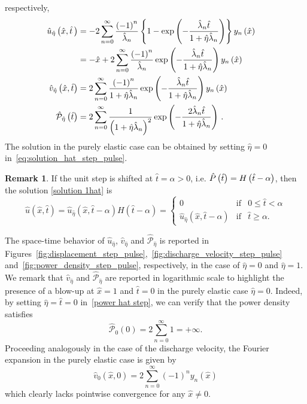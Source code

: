 \documentclass[12pt,a4paper]{amsart}
\theoremstyle{definition}
\newtheorem{remark}{Remark}
\newcommand{\hu}{\hat{u}}
\newcommand{\hx}{\hat{x}}
\newcommand{\hatt}{\hat{t}}
\newcommand{\heta}{\hat{\eta}}
\newcommand{\hv}{\hat{v}}
\newcommand{\hlambda}{\hat{\lambda}}
\begin{document}
respectively,
\begin{subequations}
\label{eq:solution_hat_step_pulse}
\begin{align}
\hu_{\heta}\left( \hx,\hatt\,\right) & =-2\sum_{n=0}^{\infty }\frac{\left(
-1\right) ^{n}}{\hlambda_{n}}\left\{ 1-\exp \left( -\frac{\hlambda_{n}\hatt}{%
1+\heta\hlambda_{n}}\right) \right\} y_{n}\left( \hx\right)  & &  \notag \\
& =-\hx+2\sum_{n=0}^{\infty }\frac{\left( -1\right) ^{n}}{\hlambda_{n}}\exp
\left( -\frac{\hlambda_{n}\hatt}{1+\heta\hlambda_{n}}\right) y_{n}\left( \hx%
\right)  & &  \label{u hat step} \\
\hv_{\heta}\left( \hx,\hatt\right) & =2\sum_{n=0}^{\infty }\frac{\left(
-1\right) ^{n}}{1+\heta\hlambda_{n}}\exp \left( -\frac{\hlambda_{n}\hatt}{1+%
\heta\hlambda_{n}}\right) y_{n}\left( \hx\right)  & & \\
\hat{\mathcal{P}}_{\heta}\left( \hatt\right) & =2\sum_{n=0}^{\infty }\frac{1%
}{\left( 1+\heta\hlambda_{n}\right) ^{2}}\exp \left( -\frac{2\hlambda_{n}%
\hatt}{1+\heta\hlambda_{n}}\right) \,. & &  \label{power hat step}
\end{align}
\end{subequations}
The solution in the purely elastic case can be obtained by setting
$\heta =0$ in~\eqref{eq:solution_hat_step_pulse}.
\begin{remark}
If the unit step is shifted at $\hat{t}=\alpha >0$, i.e. $\hat{P}\left( \hat{%
t}\right) =H\left( \hat{t}-\alpha \right) $, then the solution \eqref{solution 1hat} is%
\begin{equation*}
\hat{u}\left( \hat{x},\hat{t}\right) =\hat{u}_{\hat{\eta}}\left( \hat{x},%
\hat{t}-\alpha \right) H\left( \hat{t}-\alpha \right) =\left\{
\begin{array}{lll}
0 & \text{if} & 0\leq \hat{t}<\alpha  \\
\hat{u}_{\hat{\eta}}\left( \hat{x},\hat{t}-\alpha \right)  & \text{if} &
\hat{t}\geq \alpha.
\end{array}%
\right.
\end{equation*}
\end{remark}
The space-time behavior of $\hu_{\heta}$, $\hv_{\heta}$ and $\hat{\mathcal P}_{\heta}$ is reported in Figures~\ref{fig:displacement_step_pulse},~\ref{fig:discharge_velocity_step_pulse}
and~\ref{fig:power_density_step_pulse}, respectively, in the case of $\heta=0$ and $\heta=1$.
We remark that $\hv_{\heta}$ and
$\hat{\mathcal P}_{\heta}$ are reported in logarithmic scale to highlight
the presence of a blow-up at $\hat{x}=1$ and $\hatt=0$ in the purely elastic case $\heta=0$.
Indeed, by setting
$\heta=\hatt=0$ in~\eqref{power hat step}, we can verify that the power density satisfies
$$
\hat{\mathcal{P}}_{0}\left( 0 \right) =2\sum_{n=0}^{\infty } 1 = +\infty.
$$
Proceeding analogously in the case of the discharge velocity, the Fourier expansion
in the purely elastic case is given by
\begin{equation*}
\hat{v}_{0}\left( \hat{x},0\right) =2\sum_{n=0}^{\infty }\left( -1\right)
^{n}y_{n}\left( \hat{x}\right)
\end{equation*}%
which clearly lacks pointwise convergence for any $\hat{x}\neq 0$.
\end{document}
